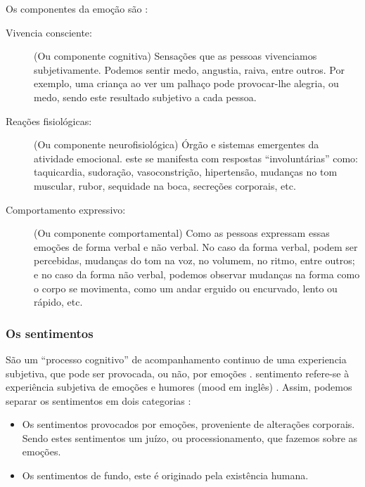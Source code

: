 Os componentes da emoção são \cite[pp. 26]{redorta2006emocion} \cite{freitas2015codigo} \cite{freitas2013psicologia} :
\begin{description}
\item[Vivencia consciente:] (Ou componente cognitiva) Sensações que as pessoas vivenciamos subjetivamente.
Podemos sentir medo, angustia, raiva, entre outros.
Por exemplo, uma criança ao ver um palhaço pode provocar-lhe alegria, ou medo,
sendo este resultado subjetivo a cada pessoa. 
\item[Reações fisiológicas:] (Ou componente neurofisiológica) Órgão e sistemas emergentes da atividade emocional.
este se manifesta com respostas ``involuntárias'' como: 
taquicardia, 
sudoração, 
vasoconstrição, 
hipertensão, 
mudanças no tom muscular,
rubor, 
sequidade na boca, 
secreções corporais, 
etc.
\item[Comportamento expressivo:] (Ou componente comportamental) 
Como as pessoas expressam essas emoções de forma verbal e não verbal.
No caso da forma verbal, podem ser percebidas, mudanças do tom na voz, no volumem, no ritmo, entre outros;
e no caso da forma não verbal, podemos observar mudanças na forma como o corpo se movimenta,
como um andar erguido ou encurvado, lento ou rápido, etc.

\end{description}



\subsubsection{Os sentimentos} 
São um ``processo cognitivo'' 
de acompanhamento continuo de uma experiencia subjetiva, 
que pode ser provocada, ou não, por emoções \cite[pp. 288]{zanelli2014psicologia} \cite{freitas2013psicologia}.
sentimento refere-se à experiência subjetiva de emoções e humores (mood em inglês) \cite[pp. 42]{hofman2015affective}.
Assim, podemos separar os sentimentos em dois categorias \cite[pp. 288]{zanelli2014psicologia}:
\begin{itemize}
\item Os sentimentos provocados por emoções, proveniente de alterações corporais.
Sendo estes sentimentos um juízo, ou processionamento, que fazemos sobre as emoções. 
\item Os sentimentos de fundo, este é originado pela existência humana.
\end{itemize}


